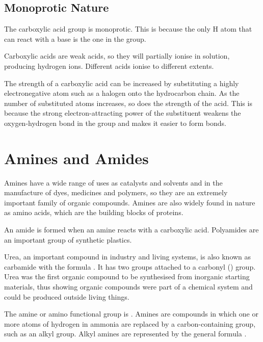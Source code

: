 	\subsection{Monoprotic Nature}
	
		The carboxylic acid group is monoprotic. This is because the only H atom that can react with a base is the one in the  group.

		Carboxylic acids are weak acids, so they will partially ionise in solution, producing hydrogen ions. Different acids ionise to different extents.

		The strength of a carboxylic acid can be increased by substituting a highly electronegative atom such as a halogen onto the hydrocarbon chain. As the number of substituted atoms increases, so does the strength of the acid. This is because the strong electron-attracting power of the substituent weakens the oxygen-hydrogen bond in the  group and makes it easier to form  bonds.

\section{Amines and Amides}

	Amines have a wide range of uses as catalysts and solvents and in the manufacture of dyes, medicines and polymers, so they are an extremely important family of organic compounds. Amines are also widely found in nature as amino acids, which are the building blocks of proteins.

	An amide is formed when an amine reacts with a carboxylic acid. Polyamides are an important group of synthetic plastics.

	Urea, an important compound in industry and living systems, is also known as carbamide with the formula . It has two  groups attached to a carbonyl () group. Urea was the first organic compound to be synthesised from inorganic starting materials, thus showing organic compounds were part of a chemical system and could be produced outside living things.

	The amine or amino functional group is . Amines are compounds in which one or more atoms of hydrogen in ammonia are replaced by a carbon-containing group, such as an alkyl group. Alkyl amines are represented by the general formula .

	\begin{center}
	\end{center}

